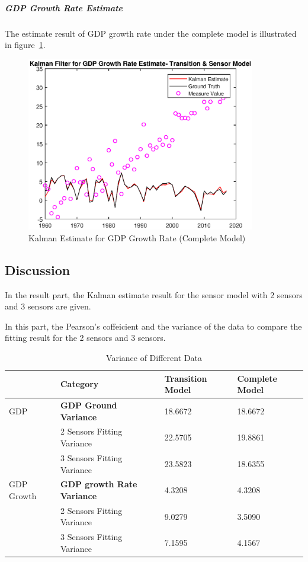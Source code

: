 \documentclass[11pt, a4paper]{article}
\begin{document}
\subparagraph{GDP Growth Rate Estimate}

The estimate result of GDP growth rate under the complete model is illustrated in figure~\ref{fig:kf8}.

\begin{figure}[htbp]
	
	\centering 
	\includegraphics[width=10cm]{kf_2_4}
	
	\caption{Kalman Estimate for GDP Growth Rate (Complete Model)}
	\label{fig:kf8}
	
\end{figure}

\subsection{Discussion}

In the result part, the Kalman estimate result for the sensor model with 2 sensors and 3 sensors are given. 

In this part, the Pearson's coffeicient and the variance of the data to compare the fitting result for the 2 sensors and 3 sensors.

\begin{table}[htbp] 
	\begin{center}
		\caption{Variance of Different Data}
		\begin{tabular}{l|l|l|l}  \hline
			& Category  & Transition Model & Complete Model \\ \hline
		GDP &	\textbf{GDP Ground Variance} & 18.6672 & 18.6672 \\  
			
			& 2 Sensors Fitting Variance &  22.5705  & 19.8861  \\
		&	3 Sensors Fitting Variance & 23.5823 & 18.6355 \\ \hline
			
	GDP Growth	&	\textbf{GDP growth Rate Variance} & 4.3208 & 4.3208 \\
			
		&	2 Sensors Fitting Variance &  9.0279  & 3.5090 \\
		&	3 Sensors Fitting Variance & 7.1595 &  4.1567 \\ \hline
		\end{tabular}
		
		\label{tab:kf_meaning2}
	\end{center}
\end{table}	
\end{document}
